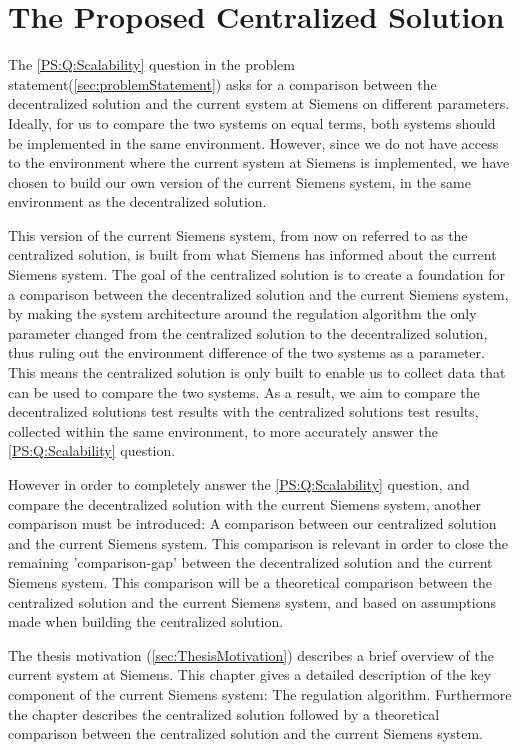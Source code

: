 \chapter{The Proposed Centralized Solution}\label{cha:existingSystem}

The \ref{PS:Q:Scalability} question in the problem statement(\cref{sec:problemStatement}) asks for a comparison between the decentralized solution and the current system at Siemens on different parameters. Ideally, for us to compare the two systems on equal terms, both systems should be implemented in the same environment. However, since we do not have access to the environment where the current system at Siemens is implemented, we have chosen to build our own version of the current Siemens system, in the same environment as the decentralized solution.

This version of the current Siemens system, from now on referred to as the centralized solution, is built from what Siemens has informed about the current Siemens system. The goal of the centralized solution is to create a foundation for a comparison between the decentralized solution and the current Siemens system, by making the system architecture around the regulation algorithm the only parameter changed from the centralized solution to the decentralized solution, thus ruling out the environment difference of the two systems as a parameter. This means the centralized solution is only built to enable us to collect data that can be used to compare the two systems. As a result, we aim to compare the decentralized solutions test results with the centralized solutions test results, collected within the same environment, to more accurately answer the \cref{PS:Q:Scalability} question.

However in order to completely answer the \ref{PS:Q:Scalability} question, and compare the decentralized solution with the current Siemens system, another comparison must be introduced: A comparison between our centralized solution and the current Siemens system. This comparison is relevant in order to close the remaining 'comparison-gap' between the decentralized solution and the current Siemens system. This comparison will be a theoretical comparison between the centralized solution and the current Siemens system, and based on assumptions made when building the centralized solution.

The thesis motivation (\cref{sec:ThesisMotivation}) describes a brief overview of the current system at Siemens. This chapter gives a detailed description of the key component of the current Siemens system: The regulation algorithm. Furthermore the chapter describes the centralized solution followed by a theoretical comparison between the centralized solution and the current Siemens system. 

